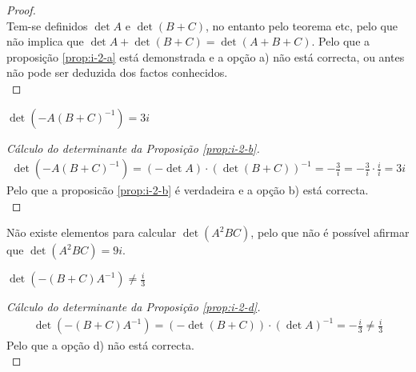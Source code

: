 \begin{proof}\;\\
	Tem-se definidos $\det A$ e $\det(B + C)$, no entanto pelo teorema etc,
	pelo que não implica que $\det A + \det(B + C) = \det(A + B + C)$.
	Pelo que a proposição \ref{prop:i-2-a} está demonstrada e a opção a) não
	está correcta, ou antes não pode ser deduzida dos
	factos conhecidos.\\
\end{proof}


\begin{proposition}[opção b]\label{prop:i-2-b}
	$\det(-A(B + C)^{-1}) = 3i$
\end{proposition}

\begin{proof}[Cálculo do determinante da Proposição \ref{prop:i-2-b}]
	\begin{align*}
		\det(-A(B + C)^{-1})
			   = (- \det A)  \cdot (\det(B + C))^{-1}
			   = -\frac{3}{i}
			   = -\frac{3}{i} \cdot \frac{i}{i}
			   = 3i
	\end{align*}
	Pelo que a proposicão \ref{prop:i-2-b} é verdadeira e a opção b) está correcta.\\
\end{proof}


\begin{proposition}
	Não existe elementos para calcular $\det(A^2 BC)$, pelo que não é
	possível afirmar que $\det(A^2 BC) = 9i$.
\end{proposition}

\begin{proposition}\label{prop:i-2-d}
	$\det(-(B + C)A^{-1}) \neq \frac{i}{3}$
\end{proposition}

\begin{proof}[Cálculo do determinante da Proposição \ref{prop:i-2-d}]
	\begin{align*}
		\det(-(B + C)A^{-1})
			   = (-\det(B + C))  \cdot (\det A)^{-1}
			   = -\frac{i}{3} \neq \frac{i}{3}
	\end{align*}
	Pelo que a opção d) não está correcta.\\
\end{proof}



